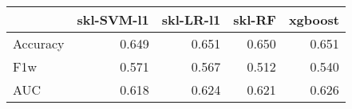 \begin{tabular}{lrrrr}
\toprule
{} &  skl-SVM-l1 &  skl-LR-l1 &  skl-RF &  xgboost \\
\midrule
Accuracy &       0.649 &      0.651 &   0.650 &    0.651 \\
F1w      &       0.571 &      0.567 &   0.512 &    0.540 \\
AUC      &       0.618 &      0.624 &   0.621 &    0.626 \\
\bottomrule
\end{tabular}
